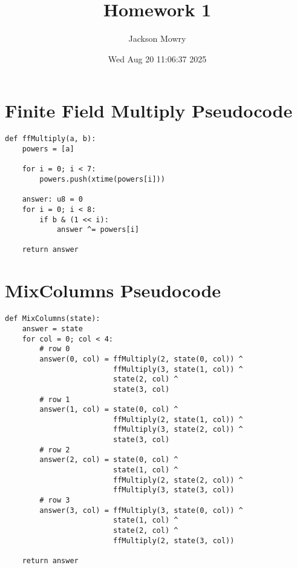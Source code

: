 \documentclass[letterpaper, 11pt]{article}
\author{Jackson Mowry}
\date{Wed Aug 20 11:06:37 2025}
\title{Homework 1}
\begin{document}
\maketitle
\tableofcontents

\section{Finite Field Multiply Pseudocode}
\label{sec:org2876b9e}
\begin{verbatim}
def ffMultiply(a, b):
    powers = [a]

    for i = 0; i < 7:
        powers.push(xtime(powers[i]))

    answer: u8 = 0
    for i = 0; i < 8:
        if b & (1 << i):
            answer ^= powers[i]

    return answer
\end{verbatim}

\clearpage
\section{MixColumns Pseudocode}
\label{sec:orgcd2ebc6}
\begin{verbatim}
def MixColumns(state):
    answer = state
    for col = 0; col < 4:
        # row 0
        answer(0, col) = ffMultiply(2, state(0, col)) ^
                         ffMultiply(3, state(1, col)) ^
                         state(2, col) ^
                         state(3, col)
        # row 1
        answer(1, col) = state(0, col) ^
                         ffMultiply(2, state(1, col)) ^
                         ffMultiply(3, state(2, col)) ^
                         state(3, col)
        # row 2
        answer(2, col) = state(0, col) ^
                         state(1, col) ^
                         ffMultiply(2, state(2, col)) ^
                         ffMultiply(3, state(3, col))
        # row 3
        answer(3, col) = ffMultiply(3, state(0, col)) ^
                         state(1, col) ^
                         state(2, col) ^
                         ffMultiply(2, state(3, col))

    return answer
\end{verbatim}
\end{document}
